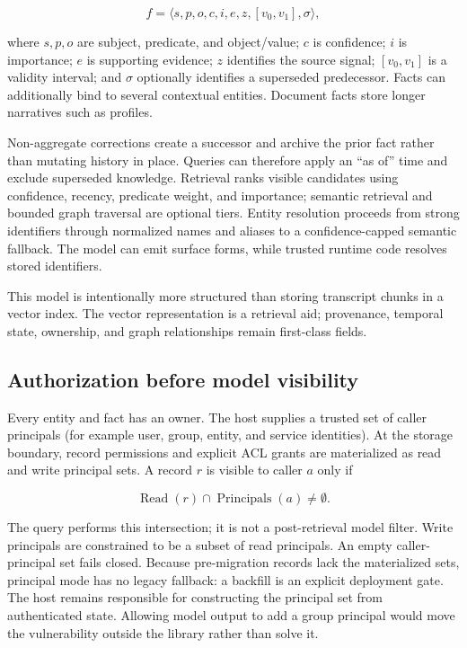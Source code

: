\documentclass[sigplan,10pt,anonymous,review]{acmart}
\begin{document}
\begin{equation}
f = \langle s,p,o,c,i,e,z,[v_0,v_1],\sigma \rangle,
\end{equation}

where $s,p,o$ are subject, predicate, and object/value; $c$ is confidence;
$i$ is importance; $e$ is supporting evidence; $z$ identifies the source
signal; $[v_0,v_1]$ is a validity interval; and $\sigma$ optionally identifies
a superseded predecessor.  Facts can additionally bind to several contextual
entities.  Document facts store longer narratives such as profiles.

Non-aggregate corrections create a successor and archive the prior fact rather
than mutating history in place.  Queries can therefore apply an ``as of'' time
and exclude superseded knowledge.  Retrieval ranks visible candidates using
confidence, recency, predicate weight, and importance; semantic retrieval and
bounded graph traversal are optional tiers.  Entity resolution proceeds from
strong identifiers through normalized names and aliases to a confidence-capped
semantic fallback.  The model can emit surface forms, while trusted runtime
code resolves stored identifiers.

This model is intentionally more structured than storing transcript chunks in
a vector index.  The vector representation is a retrieval aid; provenance,
temporal state, ownership, and graph relationships remain first-class fields.

\subsection{Authorization before model visibility}

Every entity and fact has an owner.  The host supplies a trusted set of caller
principals (for example user, group, entity, and service identities).  At the
storage boundary, record permissions and explicit ACL grants are materialized
as read and write principal sets.  A record $r$ is visible to caller $a$ only
if

\begin{equation}
\operatorname{Read}(r) \cap \operatorname{Principals}(a) \neq \emptyset .
\end{equation}

The query performs this intersection; it is not a post-retrieval model filter.
Write principals are constrained to be a subset of read principals.  An empty
caller-principal set fails closed.  Because pre-migration records lack the
materialized sets, principal mode has no legacy fallback: a backfill is an
explicit deployment gate.  The host remains responsible for constructing the
principal set from authenticated state.  Allowing model output to add a group
principal would move the vulnerability outside the library rather than solve
it.
\end{document}
